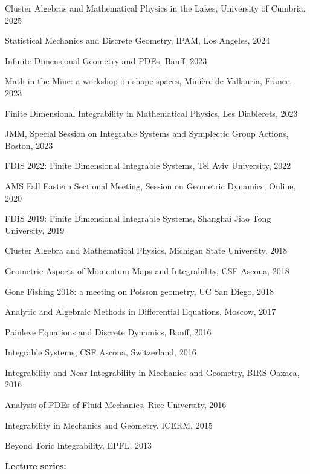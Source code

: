 \documentclass[a4paper, 12pt]{article}
\begin{document}
\begin{compactitem}
\item Cluster Algebras and Mathematical Physics in the Lakes, University of Cumbria, 2025
\item Statistical Mechanics and Discrete Geometry, IPAM, Los Angeles, 2024
\item Infinite Dimensional Geometry and PDEs, Banff, 2023
\item Math in the Mine: a workshop on shape spaces, Mini\`{e}re de Vallauria, France, 2023
\item Finite Dimensional Integrability in Mathematical Physics, Les Diablerets, 2023
\item JMM, Special Session on Integrable Systems and Symplectic Group Actions, Boston, 2023
\item {FDIS 2022: Finite Dimensional Integrable Systems}, Tel Aviv University,  2022
\item {AMS Fall Eastern Sectional Meeting,  Session on Geometric Dynamics},  Online, 2020
\item {FDIS 2019: Finite Dimensional Integrable Systems}, Shanghai Jiao Tong University,  2019
\item   {Cluster Algebra and Mathematical Physics}, Michigan State University,  2018
\item  {Geometric Aspects of Momentum Maps and Integrability},  CSF Ascona,  2018
\item   {Gone Fishing 2018: a meeting on Poisson geometry}, UC San Diego,  2018
\item {Analytic and Algebraic Methods in Differential Equations}, Moscow,
 2017
\item{Painleve Equations and Discrete Dynamics}, Banff,  2016
\item{Integrable Systems},  CSF Ascona, Switzerland,  2016
\item{Integrability and Near-Integrability in Mechanics and Geometry}, BIRS-Oaxaca,  2016
\item {Analysis of PDEs of Fluid Mechanics}, Rice University,  2016
\item {Integrability in Mechanics and Geometry}, ICERM,  2015
\item  {Beyond Toric Integrability}, EPFL,  2013
\end{compactitem}  \par\smallskip
\textbf{Lecture series:}
\end{document}
